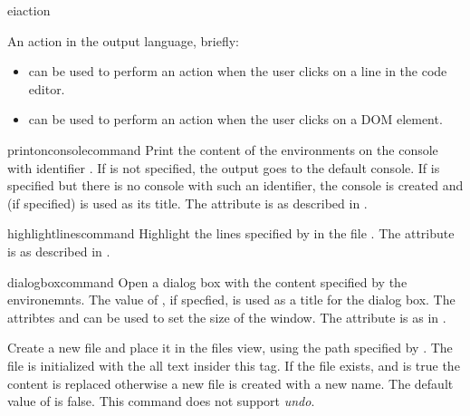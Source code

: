 \bigskip
\xmlstruct
{eiaction}
{
An action in the \ei output language, briefly:
\begin{itemize}
%
\item {} can be used to perform an action
  when the user clicks on a line in the code editor.
%
\item {} can be used to perform an action
  when the user clicks on a DOM element.

\end{itemize}
}
{}


\bigskip
\xmlstruct
{printonconsolecommand}
{
%
  Print the content of the  environments on the
  console with identifier .
%
  If  is not specified, the output goes to
  the default console.
%
  If  is specified but there is no console
  with such an identifier, the console is created and
   (if specified) is used as its title.
%
  The attribute  is as described in
  .
%
} 
{
}

\bigskip
\xmlstruct
{highlightlinescommand}
{
%
  Highlight the lines specified by  in the file
  . The attribute  is as
  described in .
%
}
{}

\bigskip
\xmlstruct
{dialogboxcommand}
{
%
  Open a dialog box with the content specified by the
   environemnts. The value of
  , if specfied, is used as a title for the
  dialog box. The attribtes  and
   can be used to set the size of the window.
  The attribute  is as in
  .
%
}
{}

\bigskip {} 
{
%
  Create a new file and place it in the files view, using the path
  specified by . The file is initialized with
  the all text insider this tag. If the file exists, and
   is true the content is replaced otherwise
  a new file is created with a new name. The default value of
   is false.
% 
  This command does not support \emph{undo}.
%
}
{}

